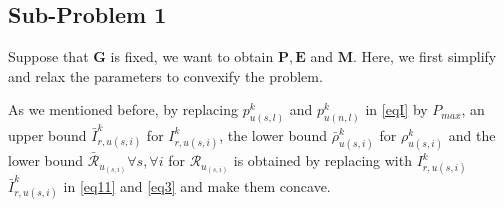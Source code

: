 \documentclass[conference]{IEEEtran}
\begin{document}
\subsection{Sub-Problem 1}\label{sub1}
Suppose that $\boldsymbol{G}$ is fixed, we want to obtain $\boldsymbol{P}, \boldsymbol{E}$ and $\boldsymbol{M}$.
Here, we first simplify and relax the parameters to convexify the problem.

As we mentioned before, by replacing $p_{u(s,l)}^{k}$ and $p_{u(n,l)}^{k}$ in \eqref{eqI} by $P_{max}$, an upper bound $\bar{I}_{r,u(s,i)}^{k}$ for $I_{r,u(s,i)}^{k}$, the lower bound $\bar{\rho}_{u(s,i)}^{k}$ 
for $\rho_{u(s,i)}^{k}$ 
and the lower bound $\bar{\mathcal{R}}_{u_{(s,i)}} \forall s , \forall i$ for  ${\mathcal{R}}_{u_{(s,i)}}$ is obtained by replacing with $I_{r,u(s,i)}^{k}$ $\bar{I}_{r,u(s,i)}^{k}$ in  \eqref{eq11} and \eqref{eq3} and make them concave.
\end{document}
